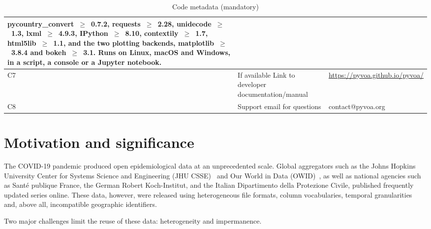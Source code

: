 \documentclass[preprint,12pt,a4paper]{elsarticle}
\begin{document}
\begin{table}[!ht]
\begin{tabular}{|l|>{\raggedright\arraybackslash}p{5.0cm}|>{\raggedright\arraybackslash}p{6.7cm}|}
  pycountry\_convert~$\geq$~0.7.2, requests~$\geq$~2.28, unidecode~$\geq$~1.3,
  lxml~$\geq$~4.9.3, IPython~$\geq$~8.10, contextily~$\geq$~1.7,
  html5lib~$\geq$~1.1, and the two plotting backends, matplotlib~$\geq$~3.8.4
  and bokeh~$\geq$~3.1. Runs on
  Linux, macOS and Windows, in a script, a console or a Jupyter notebook. \\
  \hline
  C7 & If available Link to developer documentation/manual &
  \url{https://pyvoa.github.io/pyvoa/} \\
  \hline
  C8 & Support email for questions & contact@pyvoa.org \\
  \hline
  \end{tabular}
  \caption{Code metadata (mandatory)}
  \label{codeMetadata}
  \end{table}



\section{Motivation and significance}
\label{sec:motivation}

The COVID-19 pandemic produced open epidemiological data at an unprecedented
scale. Global aggregators such as the Johns Hopkins University Center for
Systems Science and Engineering (JHU CSSE)~\cite{dong2020,dong2022} and Our
World in Data (OWID)~\cite{mathieu2021}, as well as national agencies such as
Santé publique France, the German Robert Koch-Institut, and the Italian
Dipartimento della Protezione Civile, published frequently updated series
online. These data, however, were released using heterogeneous file formats,
column vocabularies, temporal granularities and, above all, incompatible
geographic identifiers.

Two major challenges limit the reuse of these data: heterogeneity and
impermanence.

\bigskip
\end{document}
